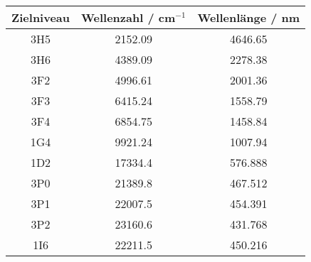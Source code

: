 \begin{center}
\begin{tabular}{|c|c|c|}
\hline
Zielniveau & Wellenzahl / cm$^{-1}$ & Wellenlänge / nm \\ \hline
3H5 & 2152.09 & 4646.65 \\ \hline
3H6 & 4389.09 & 2278.38 \\ \hline
3F2 & 4996.61 & 2001.36 \\ \hline
3F3 & 6415.24 & 1558.79 \\ \hline
3F4 & 6854.75 & 1458.84 \\ \hline
1G4 & 9921.24 & 1007.94 \\ \hline
1D2 & 17334.4 & 576.888 \\ \hline
3P0 & 21389.8 & 467.512 \\ \hline
3P1 & 22007.5 & 454.391 \\ \hline
3P2 & 23160.6 & 431.768 \\ \hline
1I6 & 22211.5 & 450.216 \\ \hline
\end{tabular}
\end{center}